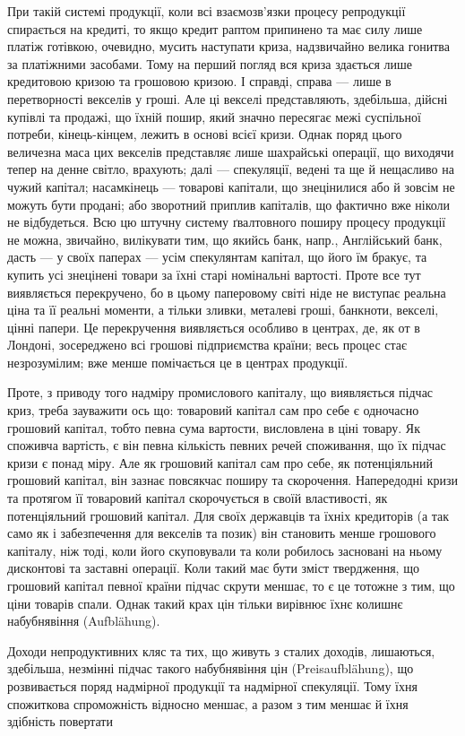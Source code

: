 При такій системі продукції, коли всі взаємозв’язки процесу репродукції спирається
на кредиті, то якщо кредит раптом припинено та має силу лише платіж готівкою,
очевидно, мусить наступати криза, надзвичайно велика гонитва за платіжними
засобами. Тому на перший погляд вся криза здається лише кредитовою кризою
та грошовою кризою. І справді, справа — лише в перетворності векселів у гроші.
Але ці векселі представляють, здебільша, дійсні купівлі та продажі, що їхній пошир,
який значно пересягає межі суспільної потреби, кінець-кінцем, лежить в основі
всієї кризи. Однак поряд цього величезна маса цих векселів представляє лише
шахрайські операції, що виходячи тепер на денне світло, врахують; далі — спекуляції,
ведені та ще й нещасливо на чужий капітал; насамкінець — товарові
капітали, що знецінилися або й зовсім не можуть бути продані; або зворотний приплив
капіталів, що фактично вже ніколи не відбудеться. Всю цю штучну систему
ґвалтовного поширу процесу продукції не можна, звичайно, вилікувати тим, що
якийсь банк, напр., Англійський банк, дасть — у своїх паперах — усім спекулянтам
капітал, що його їм бракує, та купить усі знецінені товари за їхні старі
номінальні вартості. Проте все тут виявляється перекручено, бо в цьому паперовому
світі ніде не виступає реальна ціна та її реальні моменти, а тільки
зливки, металеві гроші, банкноти, векселі, цінні папери. Це перекручення
виявляється особливо в центрах, де, як от в Лондоні, зосереджено всі грошові
підприємства країни; весь процес стає незрозумілим; вже менше помічається це
в центрах продукції.

Проте, з приводу того надміру промислового капіталу, що виявляється підчас
криз, треба зауважити ось що: товаровий капітал сам про себе є одночасно
грошовий капітал, тобто певна сума вартости, висловлена в ціні товару. Як споживча
вартість, є він певна кількість певних речей споживання, що їх підчас
кризи є понад міру. Але як грошовий капітал сам про себе, як потенціяльний
грошовий капітал, він зазнає повсякчас поширу та скорочення. Напередодні кризи та
протягом її товаровий капітал скорочується в своїй властивості, як потенціяльний
грошовий капітал. Для своїх державців та їхніх кредиторів (а так само як і забезпечення
для векселів та позик) він становить менше грошового капіталу, ніж тоді,
коли його скуповували та коли робилось засновані на ньому дисконтові та заставні
операції. Коли такий має бути зміст твердження, що грошовий капітал певної
країни підчас скрути меншає, то є це тотожне з тим, що ціни товарів спали.
Однак такий крах цін тільки вирівнює їхнє колишнє набубнявіння (Aufblähung).

Доходи непродуктивних кляс та тих, що живуть з сталих доходів, лишаються,
здебільша, незмінні підчас такого набубнявіння цін (Preisaufblähung), що
розвивається поряд надмірної продукції та надмірної спекуляції. Тому їхня спожиткова
спроможність відносно меншає, а разом з тим меншає й їхня здібність повертати
\parbreak{}  %
